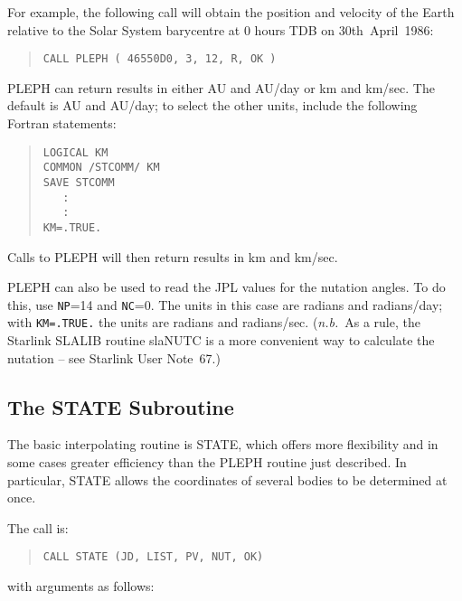 \documentclass[twoside,11pt]{article}
\newcommand{\xref}[3]{#1}
\newcommand{\xlabel}[1]{}
\renewcommand{\_}{\texttt{\symbol{95}}}
\begin{document}
For example, the following call will obtain the position and velocity of the
Earth relative to the Solar System barycentre at 0 hours TDB on
30th~April~1986:

\begin{quote}
\begin{verbatim}
CALL PLEPH ( 46550D0, 3, 12, R, OK )
\end{verbatim}
\end{quote}

PLEPH can return results in either AU and AU/day or km and km/sec.
The default is AU and AU/day; to select the other units, include the
following Fortran statements:

\begin{quote}
\begin{verbatim}
LOGICAL KM
COMMON /STCOMM/ KM
SAVE STCOMM
   :
   :
KM=.TRUE.
\end{verbatim}
\end{quote}

Calls to PLEPH will then return results in km and km/sec.

PLEPH can also be used to read the JPL values for the nutation angles.
To do this, use \texttt{NP}=14 and \texttt{NC}=0.  The units in this
case are radians and radians/day;  with \texttt{KM=.TRUE.} the units are
radians and radians/sec.  (\textit{n.b.}\ As a rule, the Starlink SLALIB
routine \xref{sla\_NUTC}{sun67}{SLA_NUTC} is a more convenient way to
calculate the nutation -- see \xref{Starlink User Note~67}{sun67}{}.)

\subsection{\xlabel{the_state_subroutine}The STATE Subroutine}
\label{the_state_subroutine}

The basic interpolating routine is STATE, which offers more
flexibility and in some cases
greater efficiency than the PLEPH routine just described.
In particular, STATE allows the coordinates of several bodies to be
determined at once.

The call is:

\begin{quote}
\begin{verbatim}
CALL STATE (JD, LIST, PV, NUT, OK)
\end{verbatim}
\end{quote}

with arguments as follows:
\end{document}

